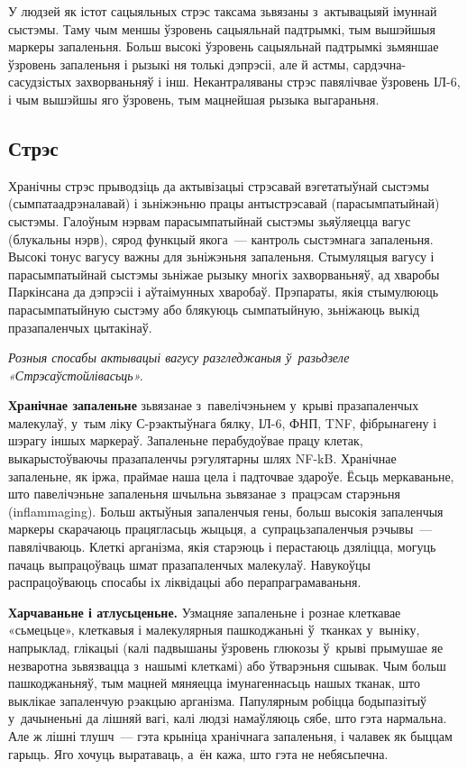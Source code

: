 У людзей як істот сацыяльных стрэс таксама зьвязаны з~актывацыяй імуннай сыстэмы. Таму чым меншы ўзровень сацыяльнай падтрымкі, тым вышэйшыя маркеры запаленьня. Больш высокі ўзровень сацыяльнай падтрымкі зьмяншае ўзровень запаленьня і рызыкі ня толькі дэпрэсіі, але й астмы, сардэчна-сасудзістых захворваньняў і інш. Некантраляваны стрэс павялічвае ўзровень ІЛ-6, і чым вышэйшы яго ўзровень, тым мацнейшая рызыка выгараньня.

\subsection*{Стрэс}

Хранічны стрэс прыводзіць да актывізацыі стрэсавай вэгетатыўнай сыстэмы (сымпатаадрэналавай) і зьніжэньню працы антыстрэсавай (парасымпатыйнай) сыстэмы. Галоўным нэрвам парасымпатыйнай сыстэмы зьяўляецца вагус (блукальны нэрв), сярод функцый якога~--- кантроль сыстэмнага запаленьня. Высокі тонус вагусу важны для зьніжэньня запаленьня. Стымуляцыя вагусу і парасымпатыйнай сыстэмы зьніжае рызыку многіх захворваньняў, ад хваробы Паркінсана да дэпрэсіі і аўтаімунных хваробаў. Прэпараты, якія стымулююць парасымпатыйную сыстэму або блякуюць сымпатыйную, зьніжаюць выкід празапаленчых цытакінаў. 

\emph{Розныя спосабы актывацыі вагусу разгледжаныя ў~разьдзеле «Стрэсаўстойлівасьць».}

\textbf{Хранічнае запаленьне} зьвязанае з~павелічэньнем у~крыві празапаленчых малекулаў, у~тым ліку С-рэактыўнага бялку, ІЛ-6, ФНП, TNF, фібрынагену і шэрагу іншых маркераў. Запаленьне перабудоўвае працу клетак, выкарыстоўваючы празапаленчы рэгулятарны шлях NF-kB. Хранічнае запаленьне, як іржа, праймае наша цела і падточвае здароўе. Ёсьць меркаваньне, што павелічэньне запаленьня шчыльна зьвязанае з~працэсам старэньня (inflammaging). Больш актыўныя запаленчыя гены, больш высокія запаленчыя маркеры скарачаюць працягласьць жыцьця, а~супрацьзапаленчыя рэчывы~--- павялічваюць. Клеткі арганізма, якія старэюць і перастаюць дзяліцца, могуць пачаць выпрацоўваць шмат празапаленчых малекулаў. Навукоўцы распрацоўваюць спосабы іх ліквідацыі або перапраграмаваньня.

\textbf{Харчаваньне і атлусьценьне.} Узмацняе запаленьне і рознае клеткавае «сьмецьце», клеткавыя і малекулярныя пашкоджаньні ў~тканках у~выніку, напрыклад, глікацыі (калі падвышаны ўзровень глюкозы ў~крыві прымушае яе незваротна зьвязвацца з~нашымі клеткамі) або ўтварэньня сшывак. Чым больш пашкоджаньняў, тым мацней мяняецца імунагеннасьць нашых тканак, што выклікае запаленчую рэакцыю арганізма. Папулярным робіцца бодыпазітыў у~дачыненьні да лішняй вагі, калі людзі намаўляюць сябе, што гэта нармальна. Але ж лішні тлушч~--- гэта крыніца хранічнага запаленьня, і чалавек як быццам гарыць. Яго хочуць выратаваць, а~ён кажа, што гэта не небясьпечна.

